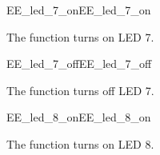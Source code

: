 \begin{function_nopb2}{EE\_led\_7\_on}{EE_led_7_on}
  
  \begin{fundescription}
    The function turns on LED 7.
  \end{fundescription}
  
  
  
\end{function_nopb2}

\begin{function_nopb2}{EE\_led\_7\_off}{EE_led_7_off}
  
  \begin{fundescription}
    The function turns off LED 7.
  \end{fundescription}
  
  
  
\end{function_nopb2}

\begin{function_nopb2}{EE\_led\_8\_on}{EE_led_8_on}
  
  \begin{fundescription}
    The function turns on LED 8.
  \end{fundescription}
  
  
  
\end{function_nopb2}

